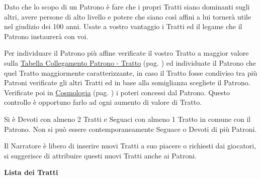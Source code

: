 \begin{multicols}{2}
Dato che lo scopo di un Patrono è fare che i propri Tratti siano dominanti sugli altri, avere persone di alto livello e potere che siano così affini a lui tornerà utile nel giudizio dei 100 anni. Usate a vostro vantaggio i Tratti ed il legame che il Patrono instaurerà con voi.

Per individuare il Patrono più affine verificate il vostro Tratto a maggior valore sulla \hyperlink{tabellacollegamentopatronotratto}{Tabella Collegamento Patrono - Tratto} (pag. \pageref{tabellacollegamentopatronotratto}) ed individuate il Patrono che quel Tratto maggiormente caratterizzante, in caso il Tratto fosse condiviso tra più Patroni verificate gli altri Tratti ed in base alla somiglianza scegliete il Patrono. Verificate poi in \hyperlink{cosmologia}{Cosmologia} (pag. \pageref{patroni}) i poteri concessi dal Patrono. Questo controllo è opportuno farlo ad ogni aumento di valore di Tratto.

Si è Devoti con almeno 2 Tratti e Seguaci con almeno 1 Tratto in comune con il Patrono. Non si può essere contemporaneamente Seguace o Devoti di più Patroni.

Il Narratore è libero di inserire nuovi Tratti a suo piacere o richiesti dai giocatori, si suggerisce di attribuire questi nuovi Tratti anche ai Patroni.

\medskip

\textbf{Lista dei Tratti}

\medskip{}
\end{multicols}
